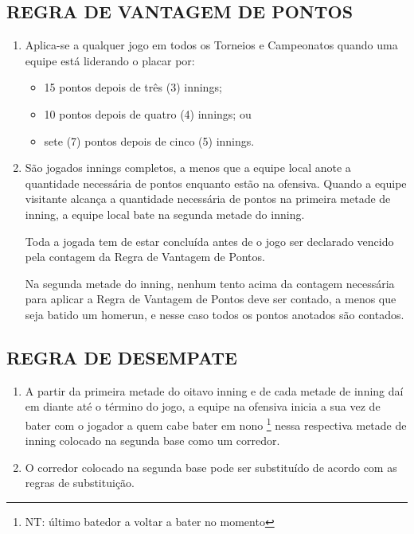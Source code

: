 \begin{multicols}{2}
\subsection{REGRA DE VANTAGEM DE PONTOS}

\begin{enumerate}[label=\alph*)]
	\item Aplica-se a qualquer jogo em todos os Torneios e Campeonatos quando uma equipe est\'a liderando o placar por: 
	\begin{itemize}
		\item 15 pontos depois de tr\^es (3) \glspl{inning}; 
		\item 10 pontos depois de quatro (4) \glspl{inning}; ou 
		\item sete (7) pontos depois de cinco (5) \glspl{inning}. 
	\end{itemize}


	\item  S\~ao jogados \glspl{inning} completos, a menos que a equipe local anote a quantidade necess\'aria de pontos enquanto est\~ao na ofensiva. Quando a equipe visitante alcan\c{c}a a quantidade necess\'aria de pontos na primeira metade de \gls{inning}, a equipe local bate na segunda metade do \gls{inning}. 
	
	Toda a jogada tem de estar conclu\'ida antes de o jogo ser declarado vencido pela contagem da Regra de Vantagem de Pontos. 
	
	Na segunda metade do \gls{inning}, nenhum tento acima da contagem necess\'aria para aplicar a Regra de Vantagem de Pontos deve ser contado, a menos que seja batido um \gls{homerun}, e nesse caso todos os pontos anotados s\~ao contados. 
\end{enumerate}

\subsection{REGRA DE DESEMPATE} 

\begin{enumerate}[label=\alph*)]
	\item A partir da primeira metade do oitavo \gls{inning} e de cada metade de \gls{inning} da\'i em diante at\'e o t\'ermino do jogo, a equipe na ofensiva inicia a sua vez de bater com o jogador a quem cabe bater em nono \footnote{NT: \'ultimo batedor a voltar a bater no momento} nessa respectiva metade de \gls{inning} colocado na segunda base como um corredor. 

	\item  O corredor colocado na segunda base pode ser substitu\'ido de acordo com as regras de substitui\c{c}\~ao. 
	

\end{enumerate}
\end{multicols}
